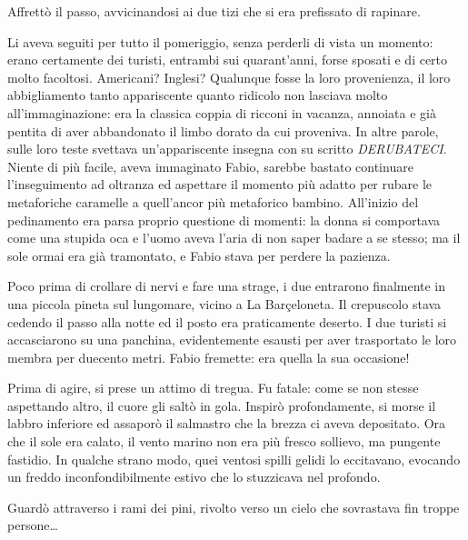 Affrettò il passo, avvicinandosi ai due tizi che si era prefissato di rapinare. 

Li aveva seguiti per tutto il pomeriggio, senza perderli di vista un momento: erano certamente dei turisti, entrambi sui quarant'anni, forse sposati e di certo molto facoltosi. Americani? Inglesi? Qualunque fosse la loro provenienza, il loro abbigliamento tanto appariscente quanto ridicolo non lasciava molto all'immaginazione: era la classica coppia di ricconi in vacanza, annoiata e già pentita di aver abbandonato il limbo dorato da cui proveniva. In altre parole, sulle loro teste svettava un'appariscente insegna con su scritto \textit{DERUBATECI}. Niente di più facile, aveva immaginato Fabio, sarebbe bastato continuare l'inseguimento ad oltranza ed aspettare il momento più adatto per rubare le metaforiche caramelle a quell'ancor più metaforico bambino. All'inizio del pedinamento era parsa proprio questione di momenti: la donna si comportava come una stupida oca e l'uomo aveva l'aria di non saper badare a se stesso; ma il sole ormai era già tramontato, e Fabio stava per perdere la pazienza.

Poco prima di crollare di nervi e fare una strage, i due entrarono finalmente in una piccola pineta sul lungomare, vicino a La Barçeloneta. Il crepuscolo stava cedendo il passo alla notte ed il posto era praticamente deserto. I due turisti si accasciarono su una panchina, evidentemente esausti per aver trasportato le loro membra per duecento metri. Fabio fremette: era quella la sua occasione!

Prima di agire, si prese un attimo di tregua. Fu fatale: come se non stesse aspettando altro, il cuore gli saltò in gola. Inspirò profondamente, si morse il labbro inferiore ed assaporò il salmastro che la brezza ci aveva depositato. Ora che il sole era calato, il vento marino non era più fresco sollievo, ma pungente fastidio. In qualche strano modo, quei ventosi spilli gelidi lo eccitavano, evocando un freddo inconfondibilmente estivo che lo stuzzicava nel profondo. 

Guardò attraverso i rami dei pini, rivolto verso un cielo che sovrastava fin troppe persone\ldots

